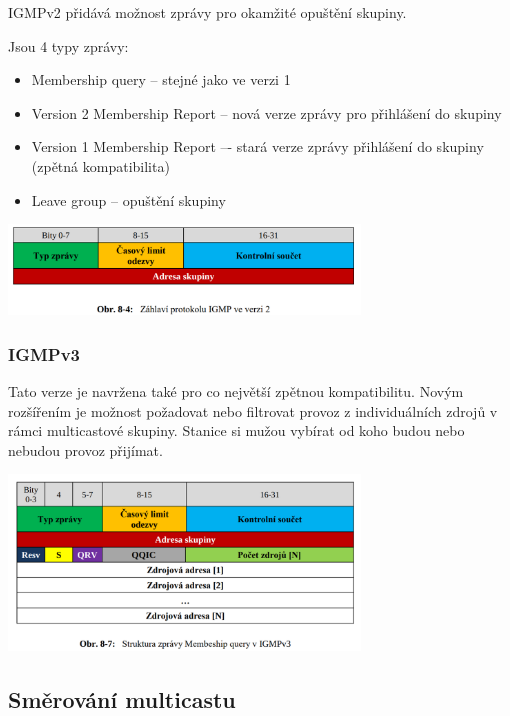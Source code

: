 IGMPv2 přidává možnost zprávy pro okamžité opuštění skupiny.

Jsou 4 typy zprávy:

\begin{itemize}[noitemsep]
    \item Membership query --  stejné jako ve verzi 1
    \item Version 2 Membership Report -- nová verze zprávy pro přihlášení do skupiny
    \item Version 1 Membership Report –- stará verze zprávy přihlášení do skupiny (zpětná kompatibilita)
    \item Leave group -- opuštění skupiny
\end{itemize}

\begin{center}
	\includegraphics[width=0.7\textwidth]{obrazky/060.png}
\end{center}

\subsubsection{IGMPv3}

Tato verze je navržena také pro co největší zpětnou kompatibilitu.
Novým rozšířením je možnost požadovat nebo filtrovat provoz z individuálních zdrojů v rámci multicastové skupiny.
Stanice si mužou vybírat od koho budou nebo nebudou provoz přijímat.

\begin{center}
	\includegraphics[width=0.7\textwidth]{obrazky/061.png}
\end{center}


\subsection{Směrování multicastu}

